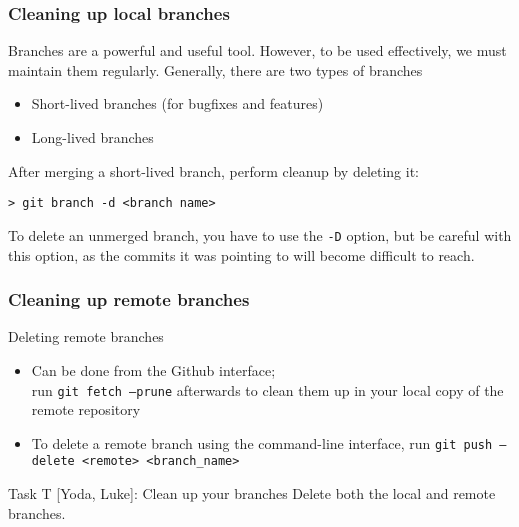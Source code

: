 
\begin{frame}[fragile]

\frametitle{Cleaning up local branches}

Branches are a powerful and useful tool. However, to be used effectively, we must maintain them regularly. Generally, there are two types of branches
\begin{itemize}
	\item Short-lived branches (for bugfixes and features)
	\item Long-lived branches
\end{itemize}

After merging a short-lived branch, perform cleanup by deleting it:
\begin{verbatim}
> git branch -d <branch name>
\end{verbatim}

To delete an unmerged branch, you have to use the \texttt{-D} option, but be careful with this option, as the commits it was pointing to will become difficult to reach.

\end{frame}



\begin{frame}[fragile]

\frametitle{Cleaning up remote branches}

\begin{block}{Deleting remote branches}
	\begin{itemize}
	\item Can be done from the Github interface;
	\\ run \texttt{git fetch --prune} afterwards to clean them up in your local copy of the remote repository
	\item To delete a remote branch using the command-line interface, run \texttt{git push --delete <remote> <branch\_name>}
	\end{itemize}
\end{block}	

\begin{block}{Task T [Yoda, Luke]: Clean up your branches}
	Delete both the local and remote branches.
\end{block}	
\end{frame}

